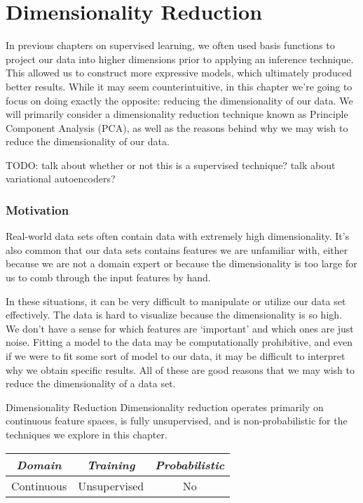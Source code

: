 \chapter{Dimensionality Reduction}
In previous chapters on supervised learning, we often used basis functions to project our data into higher dimensions prior to applying an inference technique. This allowed us to construct more expressive models, which ultimately produced better results. While it may seem counterintuitive, in this chapter we're going to focus on doing exactly the opposite: reducing the dimensionality of our data. We will primarily consider a dimensionality reduction technique known as Principle Component Analysis (PCA), as well as the reasons behind why we may wish to reduce the dimensionality of our data.

TODO: talk about whether or not this is a supervised technique? talk about variational autoencoders?

\subsection{Motivation}
Real-world data sets often contain data with extremely high dimensionality. It's also common that our data sets contains features we are unfamiliar with, either because we are not a domain expert or because the dimensionality is too large for us to comb through the input features by hand.

In these situations, it can be very difficult to manipulate or utilize our data set effectively. The data is hard to visualize because the dimensionality is so high. We don't have a sense for which features are `important' and which ones are just noise. Fitting a model to the data may be computationally prohibitive, and even if we were to fit some sort of model to our data, it may be difficult to interpret why we obtain specific results. All of these are good reasons that we may wish to reduce the dimensionality of a data set.

\begin{mlcube}{Dimensionality Reduction}
Dimensionality reduction operates primarily on continuous feature spaces, is fully unsupervised, and is non-probabilistic for the techniques we explore in this chapter.
\begin{center}
    \begin{tabular}{c|c|c}
    \textit{\textbf{Domain}} & \textit{\textbf{Training}} & \textit{\textbf{Probabilistic}} \\
    \hline
    Continuous & Unsupervised & No \\
    \end{tabular}
\end{center}
\end{mlcube}

